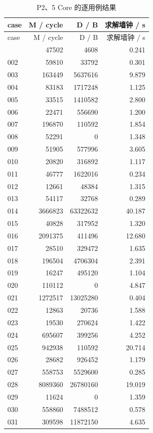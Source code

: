 \documentclass[anonymous,notoc]{gmcm2026}
\begin{document}
\begin{longtable}{lrrr}
\caption{P2、5 Core 的逐用例结果}\\
\toprule
case & M / cycle & D / B & 求解墙钟 / s\\\midrule
\endfirsthead
\toprule
case & M / cycle & D / B & 求解墙钟 / s\\\midrule
\endhead
\bottomrule\endfoot
001 & 47502 & 4608 & 0.241 \\
002 & 59810 & 33792 & 0.301 \\
003 & 163449 & 5637616 & 9.879 \\
004 & 83183 & 1717248 & 1.125 \\
005 & 33515 & 1410582 & 2.800 \\
006 & 22471 & 556690 & 1.200 \\
007 & 196870 & 110592 & 1.854 \\
008 & 52291 & 0 & 1.348 \\
009 & 51905 & 577996 & 3.605 \\
010 & 20820 & 316892 & 1.117 \\
011 & 46777 & 1622016 & 0.234 \\
012 & 12661 & 48384 & 1.315 \\
013 & 54117 & 32768 & 0.289 \\
014 & 3666823 & 63322632 & 40.187 \\
015 & 40828 & 317952 & 1.320 \\
016 & 2091375 & 411496 & 12.680 \\
017 & 28510 & 329472 & 1.635 \\
018 & 196504 & 4706304 & 2.391 \\
019 & 16247 & 495120 & 1.104 \\
020 & 110112 & 0 & 4.847 \\
021 & 1272517 & 13025280 & 0.404 \\
022 & 12863 & 20736 & 1.588 \\
023 & 19530 & 270624 & 1.422 \\
024 & 695607 & 399256 & 4.252 \\
025 & 942938 & 110592 & 20.714 \\
026 & 28682 & 926452 & 1.179 \\
027 & 558753 & 5529600 & 0.285 \\
028 & 8089360 & 26780160 & 19.019 \\
029 & 11624 & 0 & 1.359 \\
030 & 558860 & 7488512 & 0.578 \\
031 & 309598 & 11872150 & 4.635 \\

\end{longtable}
\end{document}
